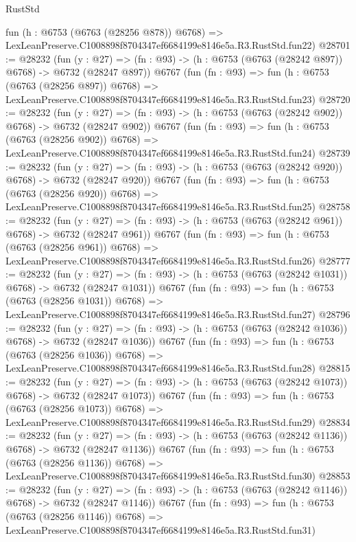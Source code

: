 \begin{lexlean}{RustStd}
\begin{coremodule}
    fun (h : @6753 (@6763 (@28256 @878)) @6768) =>
    LexLeanPreserve.C1008898f8704347ef6684199e8146e5a.R3.RustStd.fun22)
@28701 := @28232
    (fun (y : @27) => (fn : @93) -> (h : @6753 (@6763 (@28242 @897)) @6768) -> @6732 (@28247 @897))
    @6767
    (fun (fn : @93) =>
    fun (h : @6753 (@6763 (@28256 @897)) @6768) =>
    LexLeanPreserve.C1008898f8704347ef6684199e8146e5a.R3.RustStd.fun23)
@28720 := @28232
    (fun (y : @27) => (fn : @93) -> (h : @6753 (@6763 (@28242 @902)) @6768) -> @6732 (@28247 @902))
    @6767
    (fun (fn : @93) =>
    fun (h : @6753 (@6763 (@28256 @902)) @6768) =>
    LexLeanPreserve.C1008898f8704347ef6684199e8146e5a.R3.RustStd.fun24)
@28739 := @28232
    (fun (y : @27) => (fn : @93) -> (h : @6753 (@6763 (@28242 @920)) @6768) -> @6732 (@28247 @920))
    @6767
    (fun (fn : @93) =>
    fun (h : @6753 (@6763 (@28256 @920)) @6768) =>
    LexLeanPreserve.C1008898f8704347ef6684199e8146e5a.R3.RustStd.fun25)
@28758 := @28232
    (fun (y : @27) => (fn : @93) -> (h : @6753 (@6763 (@28242 @961)) @6768) -> @6732 (@28247 @961))
    @6767
    (fun (fn : @93) =>
    fun (h : @6753 (@6763 (@28256 @961)) @6768) =>
    LexLeanPreserve.C1008898f8704347ef6684199e8146e5a.R3.RustStd.fun26)
@28777 := @28232
    (fun (y : @27) =>
    (fn : @93) -> (h : @6753 (@6763 (@28242 @1031)) @6768) -> @6732 (@28247 @1031))
    @6767
    (fun (fn : @93) =>
    fun (h : @6753 (@6763 (@28256 @1031)) @6768) =>
    LexLeanPreserve.C1008898f8704347ef6684199e8146e5a.R3.RustStd.fun27)
@28796 := @28232
    (fun (y : @27) =>
    (fn : @93) -> (h : @6753 (@6763 (@28242 @1036)) @6768) -> @6732 (@28247 @1036))
    @6767
    (fun (fn : @93) =>
    fun (h : @6753 (@6763 (@28256 @1036)) @6768) =>
    LexLeanPreserve.C1008898f8704347ef6684199e8146e5a.R3.RustStd.fun28)
@28815 := @28232
    (fun (y : @27) =>
    (fn : @93) -> (h : @6753 (@6763 (@28242 @1073)) @6768) -> @6732 (@28247 @1073))
    @6767
    (fun (fn : @93) =>
    fun (h : @6753 (@6763 (@28256 @1073)) @6768) =>
    LexLeanPreserve.C1008898f8704347ef6684199e8146e5a.R3.RustStd.fun29)
@28834 := @28232
    (fun (y : @27) =>
    (fn : @93) -> (h : @6753 (@6763 (@28242 @1136)) @6768) -> @6732 (@28247 @1136))
    @6767
    (fun (fn : @93) =>
    fun (h : @6753 (@6763 (@28256 @1136)) @6768) =>
    LexLeanPreserve.C1008898f8704347ef6684199e8146e5a.R3.RustStd.fun30)
@28853 := @28232
    (fun (y : @27) =>
    (fn : @93) -> (h : @6753 (@6763 (@28242 @1146)) @6768) -> @6732 (@28247 @1146))
    @6767
    (fun (fn : @93) =>
    fun (h : @6753 (@6763 (@28256 @1146)) @6768) =>
    LexLeanPreserve.C1008898f8704347ef6684199e8146e5a.R3.RustStd.fun31)

\end{coremodule}
\end{lexlean}
